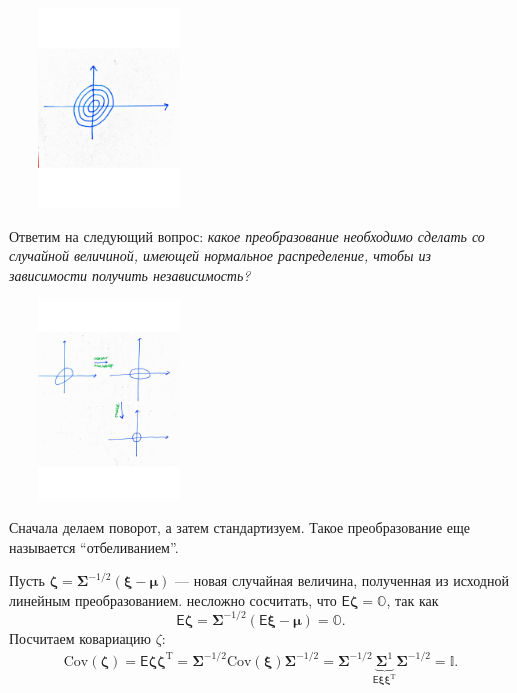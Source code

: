 \documentclass[specialist, 12pt,
subf, %
href, colorlinks=true,
substylefile = spbu.rtx,
]{disser}
\begin{document}
\begin{center}
	\begin{minipage}{0.51\linewidth}
		\centering
		\includegraphics[width=150pt, height=150pt]{p05}
	\end{minipage}
\end{center}


Ответим на следующий вопрос: \textit{какое преобразование необходимо сделать со случайной величиной, имеющей нормальное распределение, чтобы из зависимости получить независимость?}
\begin{center}
	\begin{minipage}{0.8\linewidth}
		\centering
		\includegraphics[width=150pt, height=150pt]{p06}
	\end{minipage}
\end{center}

Сначала делаем поворот, а затем стандартизуем. Такое преобразование еще называется ``отбеливанием''.

Пусть $\bm\zeta = \bm\Sigma^{-1/2} (\bm\xi - \bm\mu)$ --- новая случайная величина, полученная из исходной линейным преобразованием. несложно сосчитать, что $\textsf{E}\bm\zeta = \mathbb{O}$, так как $$\textsf{E} \bm\zeta = \bm\Sigma^{-1/2} (\textsf{E} \bm\xi - \bm\mu) = \mathbb{O}.$$
Посчитаем ковариацию $\zeta$:
\begin{gather*}
\text{Cov} (\bm\zeta) = \textsf{E} \bm\zeta \bm\zeta^{\mathrm{T}} =\bm\Sigma^{-1/2} \text{Cov} (\bm\xi) \bm\Sigma^{-1/2} = \bm\Sigma^{-1/2} \underbrace{\bm\Sigma^1}_{\textsf{E}\bm\xi \bm\xi^{\mathrm{T}}} \bm\Sigma^{-1/2} = \mathbb{I}.
\end{gather*}
\end{document}

